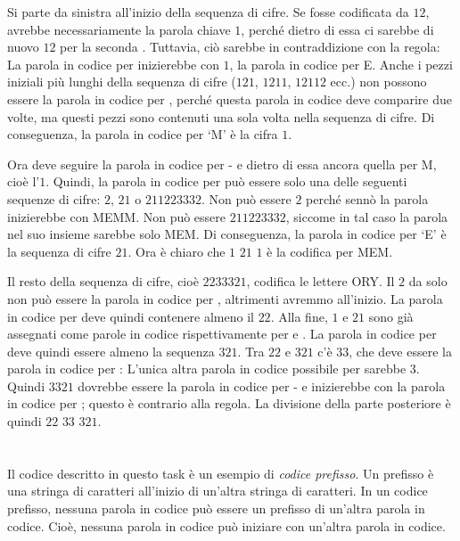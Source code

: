 {{Si parte da sinistra all’inizio della sequenza di cifre. Se  fosse codificata da $12$,  avrebbe necessariamente la parola chiave $1$, perché dietro di essa ci sarebbe di nuovo $12$ per la seconda . Tuttavia, ciò sarebbe in contraddizione con la regola: La parola in codice per  inizierebbe con $1$, la parola in codice per E. Anche i pezzi iniziali più lunghi della sequenza di cifre ($121$, $1211$, $12112$ ecc.) non possono essere la parola in codice per , perché questa parola in codice deve comparire due volte, ma questi pezzi sono contenuti una sola volta nella sequenza di cifre. Di conseguenza, la parola in codice per `M’ è la cifra $1$.

Ora deve seguire la parola in codice per  - e dietro di essa ancora quella per M, cioè l’$1$. Quindi, la parola in codice per  può essere solo una delle seguenti sequenze di cifre: $2$, $21$ o $211223332$. Non può essere $2$ perché sennò la parola inizierebbe con MEMM. Non può essere $211223332$, siccome in tal caso la parola nel suo insieme sarebbe solo MEM. Di conseguenza, la parola in codice per `E’ è la sequenza di cifre $21$. Ora è chiaro che $1$ $21$ $1$ è la codifica per MEM.

Il resto della sequenza di cifre, cioè $2233321$, codifica le lettere ORY. Il $2$ da solo non può essere la parola in codice per , altrimenti avremmo  all’inizio. La parola in codice per  deve quindi contenere almeno il $22$. Alla fine, $1$ e $21$ sono già assegnati come parole in codice rispettivamente per  e . La parola in codice per  deve quindi essere almeno la sequenza $321$. Tra $22$ e $321$ c’è $33$, che deve essere la parola in codice per : L’unica altra parola in codice possibile per  sarebbe $3$. Quindi $3321$ dovrebbe essere la parola in codice per  - e inizierebbe con la parola in codice per ; questo è contrario alla regola. La divisione della parte posteriore è quindi $22$ $33$ $321$.



\section*{\BrochureItsInformatics}
Il codice descritto in questo task è un esempio di \emph{codice prefisso}. Un prefisso è una stringa di caratteri all’inizio di un’altra stringa di caratteri. In un codice prefisso, nessuna parola in codice può essere un prefisso di un’altra parola in codice. Cioè, nessuna parola in codice può iniziare con un’altra parola in codice.

}}

